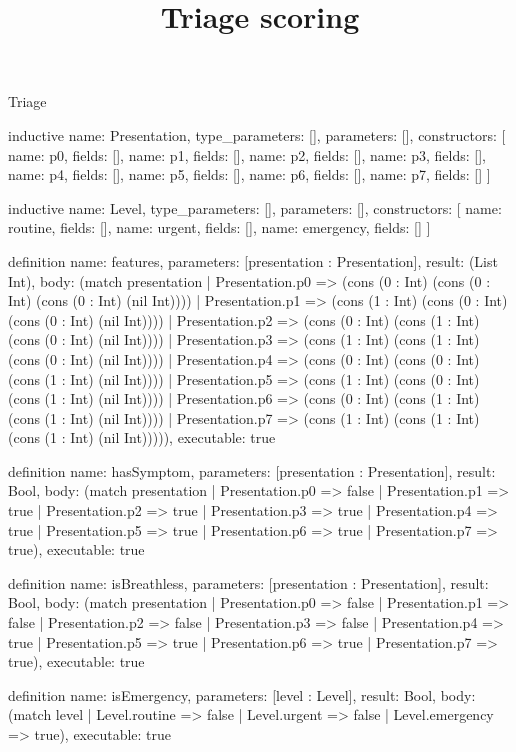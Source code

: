 \begin{lexlean}{Triage}
\title{Triage scoring}
\begin{semanticmodule}
inductive{
  name: Presentation,
  type_parameters: [],
  parameters: [],
  constructors: [
    {name: p0, fields: []},
    {name: p1, fields: []},
    {name: p2, fields: []},
    {name: p3, fields: []},
    {name: p4, fields: []},
    {name: p5, fields: []},
    {name: p6, fields: []},
    {name: p7, fields: []}
  ]
}

inductive{
  name: Level,
  type_parameters: [],
  parameters: [],
  constructors: [
    {name: routine, fields: []},
    {name: urgent, fields: []},
    {name: emergency, fields: []}
  ]
}

definition{
  name: features,
  parameters: [presentation : Presentation],
  result: (List Int),
  body: (match presentation
    | Presentation.p0 => (cons (0 : Int) (cons (0 : Int) (cons (0 : Int) (nil Int))))
    | Presentation.p1 => (cons (1 : Int) (cons (0 : Int) (cons (0 : Int) (nil Int))))
    | Presentation.p2 => (cons (0 : Int) (cons (1 : Int) (cons (0 : Int) (nil Int))))
    | Presentation.p3 => (cons (1 : Int) (cons (1 : Int) (cons (0 : Int) (nil Int))))
    | Presentation.p4 => (cons (0 : Int) (cons (0 : Int) (cons (1 : Int) (nil Int))))
    | Presentation.p5 => (cons (1 : Int) (cons (0 : Int) (cons (1 : Int) (nil Int))))
    | Presentation.p6 => (cons (0 : Int) (cons (1 : Int) (cons (1 : Int) (nil Int))))
    | Presentation.p7 => (cons (1 : Int) (cons (1 : Int) (cons (1 : Int) (nil Int))))),
  executable: true
}

definition{
  name: hasSymptom,
  parameters: [presentation : Presentation],
  result: Bool,
  body: (match presentation
    | Presentation.p0 => false
    | Presentation.p1 => true
    | Presentation.p2 => true
    | Presentation.p3 => true
    | Presentation.p4 => true
    | Presentation.p5 => true
    | Presentation.p6 => true
    | Presentation.p7 => true),
  executable: true
}

definition{
  name: isBreathless,
  parameters: [presentation : Presentation],
  result: Bool,
  body: (match presentation
    | Presentation.p0 => false
    | Presentation.p1 => false
    | Presentation.p2 => false
    | Presentation.p3 => false
    | Presentation.p4 => true
    | Presentation.p5 => true
    | Presentation.p6 => true
    | Presentation.p7 => true),
  executable: true
}

definition{
  name: isEmergency,
  parameters: [level : Level],
  result: Bool,
  body: (match level | Level.routine => false | Level.urgent => false | Level.emergency => true),
  executable: true
}


\end{semanticmodule}
\end{lexlean}
